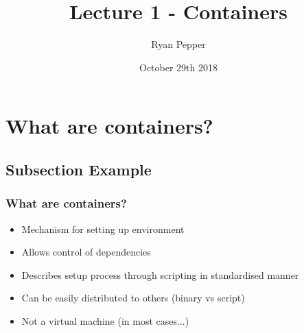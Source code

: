 \documentclass{beamer}
\title[Lecture 1 - Containers]{Lecture 1 - Containers} %
\author{Ryan Pepper} %
\institute[University of Southampton] %
{
University of Southampton \\ %
\medskip
\textit{ryan.pepper@soton.ac.uk} %
}
\date{October 29th 2018} %
\begin{document}
\begin{frame}
\titlepage %
\end{frame}



\section{What are containers?} %

\subsection{Subsection Example} %

\begin{frame}
\frametitle{What are containers?}
\begin{itemize}
    \item Mechanism for setting up environment
    \item Allows control of dependencies
    \item Describes setup process through scripting in standardised manner
    \item Can be easily distributed to others (binary vs script)
    \item Not a virtual machine (in most cases...)
\end{itemize}
\end{frame}
\end{document}
